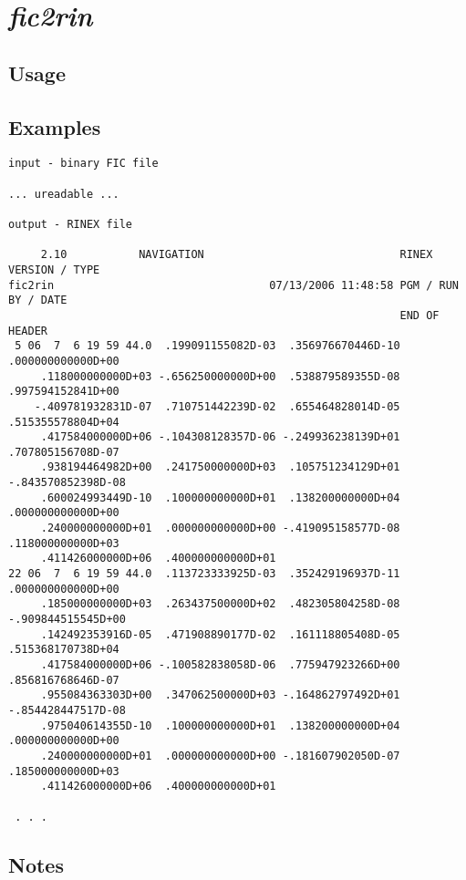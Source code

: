 %
%

\section{\emph{fic2rin}}
\subsection{Usage}

\subsection{Examples}
\begin{\outputsize}
\begin{Verbatim}
input - binary FIC file

... ureadable ...

output - RINEX file

     2.10           NAVIGATION                              RINEX VERSION / TYPE
fic2rin                                 07/13/2006 11:48:58 PGM / RUN BY / DATE
                                                            END OF HEADER
 5 06  7  6 19 59 44.0  .199091155082D-03  .356976670446D-10  .000000000000D+00
     .118000000000D+03 -.656250000000D+00  .538879589355D-08  .997594152841D+00
    -.409781932831D-07  .710751442239D-02  .655464828014D-05  .515355578804D+04
     .417584000000D+06 -.104308128357D-06 -.249936238139D+01  .707805156708D-07
     .938194464982D+00  .241750000000D+03  .105751234129D+01 -.843570852398D-08
     .600024993449D-10  .100000000000D+01  .138200000000D+04  .000000000000D+00
     .240000000000D+01  .000000000000D+00 -.419095158577D-08  .118000000000D+03
     .411426000000D+06  .400000000000D+01
22 06  7  6 19 59 44.0  .113723333925D-03  .352429196937D-11  .000000000000D+00
     .185000000000D+03  .263437500000D+02  .482305804258D-08 -.909844515545D+00
     .142492353916D-05  .471908890177D-02  .161118805408D-05  .515368170738D+04
     .417584000000D+06 -.100582838058D-06  .775947923266D+00  .856816768646D-07
     .955084363303D+00  .347062500000D+03 -.164862797492D+01 -.854428447517D-08
     .975040614355D-10  .100000000000D+01  .138200000000D+04  .000000000000D+00
     .240000000000D+01  .000000000000D+00 -.181607902050D-07  .185000000000D+03
     .411426000000D+06  .400000000000D+01

 . . .

\end{Verbatim}
\end{\outputsize}

\subsection{Notes}


%


